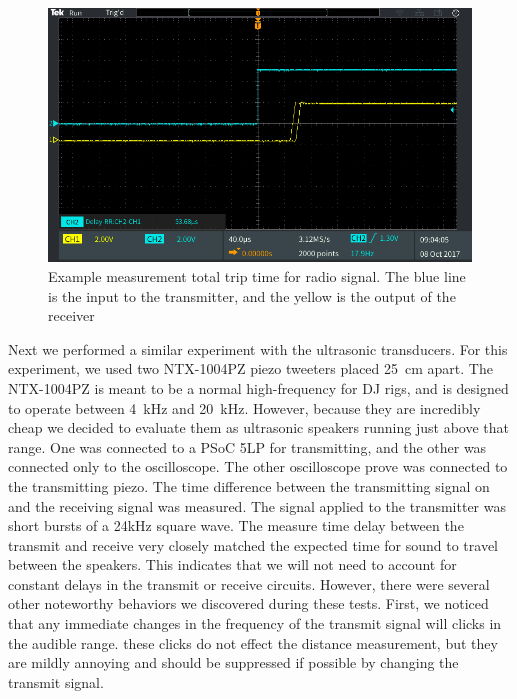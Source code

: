 \documentclass{article}
\begin{document}
      \begin{figure}
        \centering
        \includegraphics[scale=0.2]{./images/rf_delay_ex.PNG}
        \caption{Example measurement total trip time for radio signal. The blue line is the input to the transmitter, and the yellow is the output of the receiver}
        \label{fig:rf_delay_ex}
      \end{figure}


      Next we performed a similar experiment with the ultrasonic transducers. For this experiment, we used two NTX-1004PZ piezo tweeters placed \SI{25}{\centi\meter} apart. The NTX-1004PZ is meant to be a normal high-frequency for DJ rigs, and is designed to operate between \SI{4}{\kilo\hertz} and \SI{20}{\kilo\hertz}. However, because they are incredibly cheap we decided to evaluate them as ultrasonic speakers running just above that range. One was connected to a PSoC 5LP for transmitting, and the other was connected only to the oscilloscope. The other oscilloscope prove was connected to the transmitting piezo. The time difference between the transmitting signal on and the receiving signal was measured. The signal applied to the transmitter was short bursts of a 24kHz square wave. The measure time delay between the transmit and receive very closely matched the expected time for sound to travel between the speakers. This indicates that we will not need to account for constant delays in the transmit or receive circuits. However, there were several other noteworthy behaviors we discovered during these tests. First, we noticed that any immediate changes in the frequency of the transmit signal will clicks in the audible range. these clicks do not effect the distance measurement, but they are mildly annoying and should be suppressed if possible by changing the transmit signal.
\end{document}
